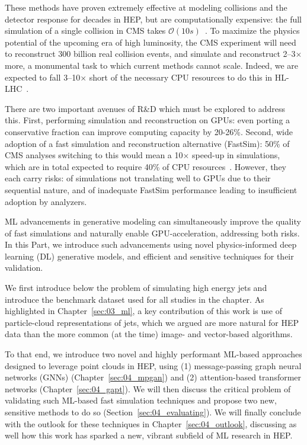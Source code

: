 These methods have proven extremely effective at modeling collisions and the detector response for decades in HEP, but are computationally expensive: the full simulation of a single collision in CMS takes $\mathcal O(10\unit{s})$~\cite{Pedro:2018jqu}. 
To maximize the physics potential of the upcoming era of high luminosity, the CMS experiment will need to reconstruct 300 billion real collision events, and
simulate and reconstruct 2--3$\times$ more, a monumental task to which current methods cannot scale.
Indeed, we are expected to fall 3--10$\times$ short of the necessary CPU resources to do this in HL-LHC~\cite{CMS:2815292}.

There are two important avenues of R\&D which must be explored to address this.
First, performing simulation and reconstruction on GPUs: even porting a conservative fraction can improve computing capacity by 20-26\%.
Second, wide adoption of a fast simulation and reconstruction alternative (FastSim): 50\% of CMS analyses switching to this would mean a 10$\times$ speed-up in simulations, which are in total expected to require 40\% of CPU resources~\cite{CMS:2815292}.
However, they each carry risks: of simulations not translating well to GPUs due to their sequential nature, and of inadequate FastSim performance leading to insufficient adoption by analyzers.

ML advancements in generative modeling can simultaneously improve the quality of fast simulations and naturally enable GPU-acceleration, addressing both risks.
In this Part, we introduce such advancements using novel physics-informed deep learning (DL) generative models, and efficient and sensitive techniques for their validation.

We first introduce below the problem of simulating high energy jets and introduce the \jetnet benchmark dataset used for all studies in the chapter.
As highlighted in Chapter~\ref{sec:03_ml}, a key contribution of this work is use of particle-cloud representations of jets, which we argued are more natural for HEP data than the more common (at the time) image- and vector-based algorithms.

To that end, we introduce two novel and highly performant ML-based approaches designed to leverage point clouds in HEP, using (1) message-passing graph neural networks (GNNs) (Chapter~\ref{sec:04_mpgan}) and (2) attention-based transformer networks (Chapter~\ref{sec:04_gapt}).
We will then discuss the critical problem of validating such ML-based fast simulation techniques and propose two new, sensitive methods to do so (Section~\ref{sec:04_evaluating}).
We will finally conclude with the outlook for these techniques in Chapter~\ref{sec:04_outlook}, discussing as well how this work has sparked a new, vibrant subfield of ML research in HEP.

